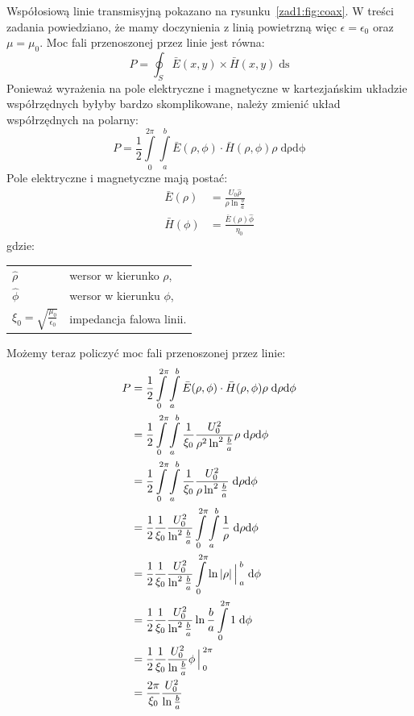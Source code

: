 \documentclass[rep.tex]{subfiles}
\begin{document}
Współosiową linie transmisyjną pokazano na rysunku~\ref{zad1:fig:coax}.
W treści zadania powiedziano, że mamy doczynienia z linią powietrzną więc $\epsilon = \epsilon_0$ oraz $\mu = \mu_0$.
Moc fali przenoszonej przez linie jest równa:
\begin{equation}
  P = \oint_S\bar{E}(x, y) \times \bar{H}(x, y) \; \mathrm{ds}
\end{equation}
Ponieważ wyrażenia na pole elektryczne i magnetyczne w kartezjańskim układzie współrzędnych byłyby bardzo skomplikowane,
należy zmienić układ współrzędnych na polarny:
\begin{equation}
  P = \frac{1}{2} \int\limits_0^{2\pi}\int\limits_a^b \bar{E}(\rho, \phi) \cdot \bar{H}(\rho, \phi) \rho \; \mathrm{d\rho} \mathrm{d\phi}
\end{equation}
Pole elektryczne i magnetyczne mają postać:
\begin{align}
  \bar{E}(\rho)    & = \frac{U_0\hat{\rho}}{\rho \ln \frac{b}{a}} \\
  \bar{H}(\phi) & = \frac{\bar{E}(\rho)\hat{\phi}}{\eta_0}
\end{align}
gdzie: \\
\begin{tabular}{l @{ - } l}
  $\hat{\rho}$    & wersor w kierunko $\rho$, \\
  $\hat{\phi}$ & wersor w kierunku $\phi$, \\
  $\xi_0 = \sqrt{\frac{\mu_0}{\epsilon_0}}$ & impedancja falowa linii. \\
\end{tabular}

Możemy teraz policzyć moc fali przenoszonej przez linie:
\begin{align}
  P & =  \frac{1}{2} \int\limits_0^{2\pi}\int\limits_a^b \bar{E}(\rho, \phi) \cdot \bar{H}(\rho, \phi) \rho \; \mathrm{d\rho} \mathrm{d\phi} \nonumber \\
    & =  \frac{1}{2} \int\limits_0^{2\pi}\int\limits_a^b \frac{1}{\xi_0}\frac{U_0^2}{\rho^2\ln^2\frac{b}{a}} \rho \; \mathrm{d\rho} \mathrm{d\phi} \nonumber \\
    & =  \frac{1}{2} \int\limits_0^{2\pi}\int\limits_a^b \frac{1}{\xi_0}\frac{U_0^2}{\rho\ln^2\frac{b}{a}} \; \mathrm{d\rho} \mathrm{d\phi} \nonumber \\
    & =  \frac{1}{2} \frac{1}{\xi_0}\frac{U_0^2}{\ln^2\frac{b}{a}} \int\limits_0^{2\pi}\int\limits_a^b \frac{1}{\rho} \; \mathrm{d\rho} \mathrm{d\phi} \nonumber \\
    & =  \frac{1}{2} \frac{1}{\xi_0}\frac{U_0^2}{\ln^2\frac{b}{a}} \int\limits_0^{2\pi} \ln|\rho|\Big\arrowvert_a^b \; \mathrm{d\phi} \nonumber \\
    & =  \frac{1}{2} \frac{1}{\xi_0}\frac{U_0^2}{\ln^2\frac{b}{a}} \ln\frac{b}{a} \int\limits_0^{2\pi} 1 \; \mathrm{d\phi} \nonumber \\
    & =  \frac{1}{2} \frac{1}{\xi_0}\frac{U_0^2}{\ln\frac{b}{a}} \phi\Big\arrowvert_0^{2\pi} \nonumber \\
    & =  \frac{2\pi}{\xi_0}\frac{U_0^2}{\ln\frac{b}{a}} \label{eqn:zad1:power}
\end{align}
\end{document}
